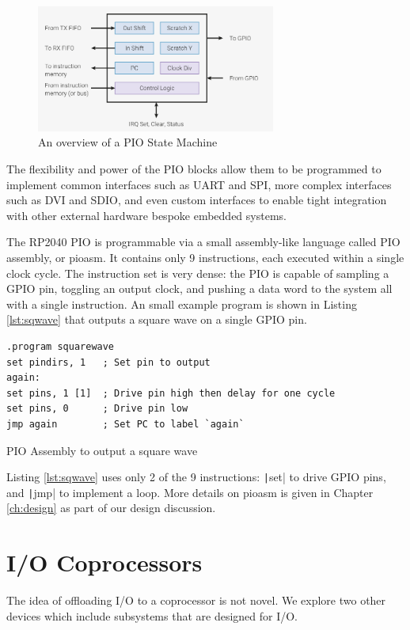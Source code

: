 \begin{figure}[H]
    \centering
    \includegraphics[width=0.7\textwidth]{../img/rp2040-state-machine.png}
    \caption{An overview of a PIO State Machine \citep{rp2040}}
    \label{fig:pio-sm}
\end{figure}

The flexibility and power of the PIO blocks allow them to be programmed to implement common interfaces such as UART and SPI, more complex interfaces such as DVI and SDIO, and even custom interfaces to enable tight integration with other external hardware bespoke embedded systems.

The RP2040 PIO is programmable via a small assembly-like language called PIO assembly, or pioasm. It contains only 9 instructions, each executed within a single clock cycle. The instruction set is very dense: the PIO is capable of sampling a GPIO pin, toggling an output clock, and pushing a data word to the system all with a single instruction. An small example program is shown in Listing \ref{lst:sqwave} that outputs a square wave on a single GPIO pin.

\begin{listing}[b]
    \vspace{0.5cm}
    \begin{verbatim}
.program squarewave
set pindirs, 1   ; Set pin to output
again:
set pins, 1 [1]  ; Drive pin high then delay for one cycle
set pins, 0      ; Drive pin low
jmp again        ; Set PC to label `again`
    \end{verbatim}
    \caption{PIO Assembly to output a square wave \citep{rp2040}}
    \label{lst:sqwave}
\end{listing}

Listing \ref{lst:sqwave} uses only 2 of the 9 instructions: \texttt|set| to drive GPIO pins, and \texttt|jmp| to implement a loop. More details on pioasm is given in Chapter \ref{ch:design} as part of our design discussion.

\section{I/O Coprocessors}
The idea of offloading I/O to a coprocessor is not novel. We explore two other devices which include subsystems that are designed for I/O.
